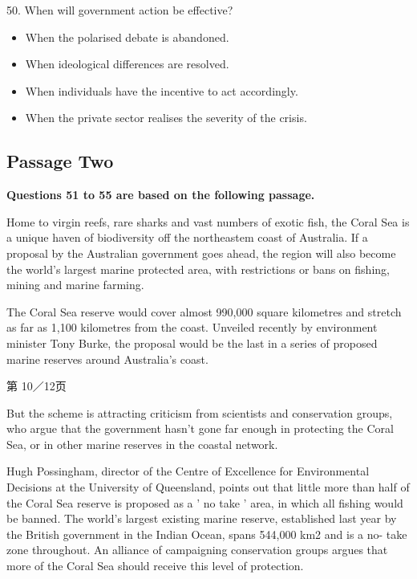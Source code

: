 \documentclass[UTF8,11pt]{ctexart}
\begin{document}
50. When will government action be effective?


\begin{itemize}[leftmargin=2em,itemsep=.2em,topsep=.4em]\item[A.] When the polarised debate is abandoned.
\item[B.] When ideological differences are resolved.
\item[C.] When individuals have the incentive to act accordingly.
\item[D.] When the private sector realises the severity of the crisis.
\end{itemize}

\subsection*{\textbf{Passage Two}}


\textbf{Questions 51 to 55 are based on the following passage.}


Home to virgin reefs, rare sharks and vast numbers of exotic fish, the Coral Sea is a unique haven of biodiversity off the northeastem coast of Australia. If a proposal by the Australian government goes ahead, the region will also become the world's largest marine protected area, with restrictions or bans on fishing, mining and marine farming.


The Coral Sea reserve would cover almost 990,000 square kilometres and stretch as far as 1,100 kilometres from the coast. Unveiled recently by environment minister Tony Burke, the proposal would be the last in a series of proposed marine reserves around Australia's coast.


第 10／12页


But the scheme is attracting criticism from scientists and conservation groups, who argue that the government hasn't gone far enough in protecting the Coral Sea, or in other marine reserves in the coastal network.


Hugh Possingham, director of the Centre of Excellence for Environmental Decisions at the University of Queensland, points out that little more than half of the Coral Sea reserve is proposed as a ' no take ' area, in which all fishing would be banned. The world's largest existing marine reserve, established last year by the British government in the Indian Ocean, spans 544,000 km2 and is a no- take zone throughout. An alliance of campaigning conservation groups argues that more of the Coral Sea should receive this level of protection.
\end{document}
